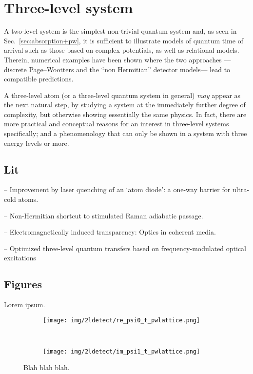 \section{Three-level system}\label{sec:pw3l}

A two-level system is the simplest non-trivial quantum system and,
as seen in Sec.~\ref{sec:absorption+pw},
it is sufficient to illustrate
models of quantum time of arrival
such as those based on complex potentials,
as well as relational models.
Therein, numerical examples have been shown where the two approaches
---discrete Page--Wootters and the ``non Hermitian'' detector models---
lead to
compatible predictions.

A three-level atom (or a three-level quantum system in general) \emph{may} appear as
the next natural step, by studying a system at the immediately further
degree of complexity, but otherwise showing essentially
the same physics. In fact, there are more practical and conceptual reasons
for an interest in three-level systems specifically; and a phenomenology
that can only be shown in a system with three energy levels or more.

\subsection{Lit}
\cite{Ruschhaupt_AtomDiode} -- Improvement by laser quenching of an `atom diode': a one-way barrier for ultra-cold atoms.

\cite{NonHermitianShortcutSTIRAP} -- Non-Hermitian shortcut to stimulated Raman adiabatic passage.

\cite{EIT_Review} -- Electromagnetically induced transparency: Optics in coherent media.

\cite{OptimizedTransferSTIRAP} -- Optimized three-level quantum transfers based on frequency-modulated optical excitations


\subsection{Figures}

Lorem ipsum.

\begin{figure}
  \centering
  \begin{subfigure}[b]{1.0\textwidth}
    \texttt{[image: img/2ldetect/re\_psi0\_t\_pwlattice.png]}
    \label{fig:aabsorbed-qubit-components_pwlattice:re0}
  \end{subfigure}
  \\
  \begin{subfigure}[b]{1.0\textwidth}
    \texttt{[image: img/2ldetect/im\_psi1\_t\_pwlattice.png]}
    \label{fig:aabsorbed-qubit-components_pwlattice:im1}
  \end{subfigure}
  \caption{
    Blah blah blah.
  }
  \label{fig:aabsorbed-qubit-components_pwlattice}
\end{figure}
